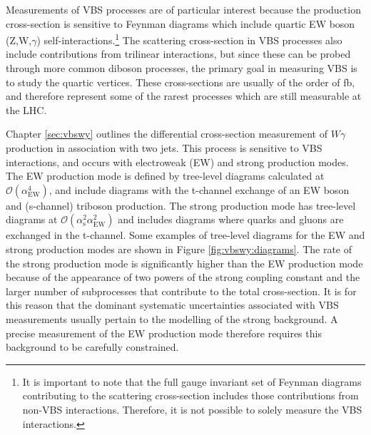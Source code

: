 Measurements of VBS processes are of particular interest because the production cross-section is sensitive to Feynman diagrams which include quartic EW boson (Z,W,$\gamma$) self-interactions.\footnote{It is important to note that the full gauge invariant set of Feynman diagrams contributing to the scattering cross-section includes those contributions from non-VBS interactions. Therefore, it is not possible to solely measure the VBS interactions.} The scattering cross-section in VBS processes also include contributions from trilinear interactions, but since these can be probed through more common diboson processes, the primary goal in measuring VBS is to study the quartic vertices. These cross-sections are usually of the order of fb, and therefore represent some of the rarest processes which are still measurable at the LHC. 

Chapter \ref{sec:vbswy} outlines the differential cross-section measurement of $W\gamma$ production in association with two jets. This process is sensitive to VBS interactions, and occurs with electroweak (EW) and strong production modes. The EW production mode is defined by tree-level diagrams calculated at $\mathcal{O}(\alpha_{\text{EW}}^4)$, and include diagrams with the t-channel exchange of an EW boson and (s-channel) triboson production. The strong production mode has tree-level diagrams at $\mathcal{O}(\alpha_{\text{s}}^2\alpha_{\text{EW}}^2)$ and includes diagrams where quarks and gluons are exchanged in the t-channel. Some examples of tree-level diagrams for the EW and strong production modes are shown in Figure \ref{fig:vbswy:diagrams}. The rate of the strong production mode is significantly higher than the EW production mode because of the appearance of two powers of the strong coupling constant and the larger number of subprocesses that contribute to the total cross-section. It is for this reason that the dominant systematic uncertainties associated with VBS measurements usually pertain to the modelling of the strong background. A precise measurement of the EW production mode therefore requires this background to be carefully constrained.

